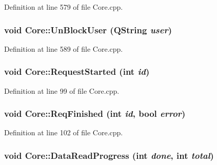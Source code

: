 Definition at line 579 of file Core.cpp.\hypertarget{classCore_abc783553ec1e543435b8dc06f64939f}{
\subsubsection{\setlength{\rightskip}{0pt plus 5cm}void Core::UnBlockUser (QString {\em user})}}
\label{classCore_abc783553ec1e543435b8dc06f64939f}




Definition at line 589 of file Core.cpp.\hypertarget{classCore_2e3b63ac22f8fef5f2d2d5e9adc42cdd}{
\subsubsection{\setlength{\rightskip}{0pt plus 5cm}void Core::RequestStarted (int {\em id})}}
\label{classCore_2e3b63ac22f8fef5f2d2d5e9adc42cdd}




Definition at line 99 of file Core.cpp.\hypertarget{classCore_7b649f8d3aeae37e3f2e0eff65ab189f}{
\subsubsection{\setlength{\rightskip}{0pt plus 5cm}void Core::ReqFinished (int {\em id}, \/  bool {\em error})}}
\label{classCore_7b649f8d3aeae37e3f2e0eff65ab189f}




Definition at line 102 of file Core.cpp.\hypertarget{classCore_77844f4e1b5e81ff4a13bc22328a4258}{
\subsubsection{\setlength{\rightskip}{0pt plus 5cm}void Core::DataReadProgress (int {\em done}, \/  int {\em total})}}
\label{classCore_77844f4e1b5e81ff4a13bc22328a4258}




